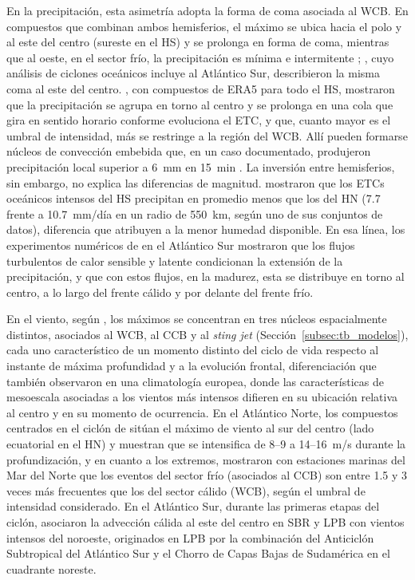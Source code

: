 En la precipitación, esta asimetría adopta la forma de coma asociada al WCB.
En compuestos que combinan ambos hemisferios, el máximo se ubica hacia el polo y al este del centro (sureste en el HS) y se prolonga en forma de coma, mientras que al oeste, en el sector frío, la precipitación es mínima e intermitente \citep{naud2020evaluation}; \citet{field2007precipitation}, cuyo análisis de ciclones oceánicos incluye al Atlántico Sur, describieron la misma coma al este del centro.
\citet{mcerlich2023extremes}, con compuestos de ERA5 para todo el HS, mostraron que la precipitación se agrupa en torno al centro y se prolonga en una cola que gira en sentido horario conforme evoluciona el ETC, y que, cuanto mayor es el umbral de intensidad, más se restringe a la región del WCB.
Allí pueden formarse núcleos de convección embebida que, en un caso documentado, produjeron precipitación local superior a 6~mm en 15~min \citep{oertel2021warm}.
La inversión entre hemisferios, sin embargo, no explica las diferencias de magnitud. \citet{kodama2019perspective} mostraron que los ETCs oceánicos intensos del HS precipitan en promedio menos que los del HN (7.7 frente a 10.7~mm/día en un radio de 550~km, según uno de sus conjuntos de datos), diferencia que atribuyen a la menor humedad disponible.
En esa línea, los experimentos numéricos de \citet{gozzo2013air} en el Atlántico Sur mostraron que los flujos turbulentos de calor sensible y latente condicionan la extensión de la precipitación, y que con estos flujos, en la madurez, esta se distribuye en torno al centro, a lo largo del frente cálido y por delante del frente frío.

En el viento, según \citet{catto2016extratropical}, los máximos se concentran en tres núcleos espacialmente distintos, asociados al WCB, al CCB y al \textit{sting jet} (Sección~\ref{subsec:tb_modelos}), cada uno característico de un momento distinto del ciclo de vida respecto al instante de máxima profundidad y a la evolución frontal, diferenciación que \citet{eisenstein2023identification} también observaron en una climatología europea, donde las características de mesoescala asociadas a los vientos más intensos difieren en su ubicación relativa al centro y en su momento de ocurrencia.
En el Atlántico Norte, los compuestos centrados en el ciclón de \citet{rudeva2011composite} sitúan el máximo de viento al sur del centro (lado ecuatorial en el HN) y muestran que se intensifica de 8--9 a 14--16~m/s durante la profundización, y en cuanto a los extremos, \citet{gentile2023observed} mostraron con estaciones marinas del Mar del Norte que los eventos del sector frío (asociados al CCB) son entre 1.5 y 3 veces más frecuentes que los del sector cálido (WCB), según el umbral de intensidad considerado.
En el Atlántico Sur, durante las primeras etapas del ciclón, \citet{gramcianinov2024early} asociaron la advección cálida al este del centro en SBR y LPB con vientos intensos del noroeste, originados en LPB por la combinación del Anticiclón Subtropical del Atlántico Sur y el Chorro de Capas Bajas de Sudamérica en el cuadrante noreste.

